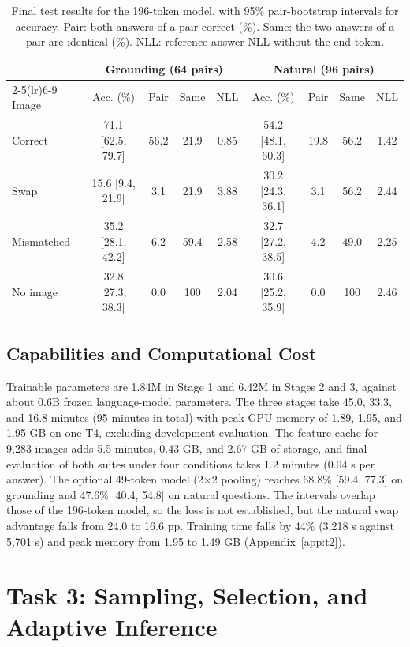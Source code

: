 \documentclass{article}
\begin{document}
\begin{table}[t]
\centering
\caption{Final test results for the 196-token model, with 95\% pair-bootstrap intervals for accuracy. Pair: both answers of a pair correct (\%). Same: the two answers of a pair are identical (\%). NLL: reference-answer NLL without the end token.}
\label{tab:t2-final}
\footnotesize
\setlength{\tabcolsep}{3pt}
\begin{tabular}{lcccc@{\hspace{9pt}}cccc}
\toprule
 & \multicolumn{4}{c}{Grounding (64 pairs)} & \multicolumn{4}{c}{Natural (96 pairs)} \\
\cmidrule(lr){2-5}\cmidrule(lr){6-9}
Image & Acc. (\%) & Pair & Same & NLL & Acc. (\%) & Pair & Same & NLL \\
\midrule
Correct & 71.1 [62.5, 79.7] & 56.2 & 21.9 & 0.85 & 54.2 [48.1, 60.3] & 19.8 & 56.2 & 1.42 \\
Swap & 15.6 [9.4, 21.9] & 3.1 & 21.9 & 3.88 & 30.2 [24.3, 36.1] & 3.1 & 56.2 & 2.44 \\
Mismatched & 35.2 [28.1, 42.2] & 6.2 & 59.4 & 2.58 & 32.7 [27.2, 38.5] & 4.2 & 49.0 & 2.25 \\
No image & 32.8 [27.3, 38.3] & 0.0 & 100 & 2.04 & 30.6 [25.2, 35.9] & 0.0 & 100 & 2.46 \\
\bottomrule
\end{tabular}
\end{table}

\subsection{Capabilities and Computational Cost}
Trainable parameters are 1.84M in Stage 1 and 6.42M in Stages 2 and 3, against about 0.6B frozen language-model parameters. The three stages take 45.0, 33.3, and 16.8 minutes (95 minutes in total) with peak GPU memory of 1.89, 1.95, and 1.95 GB on one T4, excluding development evaluation. The feature cache for 9,283 images adds 5.5 minutes, 0.43 GB, and 2.67 GB of storage, and final evaluation of both suites under four conditions takes 1.2 minutes (0.04 s per answer). The optional 49-token model (2$\times$2 pooling) reaches 68.8\% [59.4, 77.3] on grounding and 47.6\% [40.4, 54.8] on natural questions. The intervals overlap those of the 196-token model, so the loss is not established, but the natural swap advantage falls from 24.0 to 16.6 pp. Training time falls by 44\% (3,218 s against 5,701 s) and peak memory from 1.95 to 1.49 GB (Appendix~\ref{app:t2}).

\section{Task 3: Sampling, Selection, and Adaptive Inference}
\end{document}
